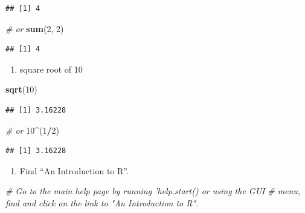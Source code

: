 \documentclass[]{book}
\newenvironment{Shaded}{\begin{snugshade}}{\end{snugshade}}
\newcommand{\KeywordTok}[1]{\textcolor[rgb]{0.13,0.29,0.53}{\textbf{#1}}}
\newcommand{\DecValTok}[1]{\textcolor[rgb]{0.00,0.00,0.81}{#1}}
\newcommand{\CommentTok}[1]{\textcolor[rgb]{0.56,0.35,0.01}{\textit{#1}}}
\newcommand{\OperatorTok}[1]{\textcolor[rgb]{0.81,0.36,0.00}{\textbf{#1}}}
\newcommand{\NormalTok}[1]{#1}
\providecommand{\tightlist}{%
  \setlength{\itemsep}{0pt}\setlength{\parskip}{0pt}}
\begin{document}
\begin{verbatim}
## [1] 4
\end{verbatim}

\begin{Shaded}
\begin{Highlighting}[]
\CommentTok{# or}
\KeywordTok{sum}\NormalTok{(}\DecValTok{2}\NormalTok{, }\DecValTok{2}\NormalTok{)}
\end{Highlighting}
\end{Shaded}

\begin{verbatim}
## [1] 4
\end{verbatim}

\begin{enumerate}
\def\labelenumi{\arabic{enumi}.}
\setcounter{enumi}{1}
\tightlist
\item
  square root of 10
\end{enumerate}

\begin{Shaded}
\begin{Highlighting}[]
\KeywordTok{sqrt}\NormalTok{(}\DecValTok{10}\NormalTok{)}
\end{Highlighting}
\end{Shaded}

\begin{verbatim}
## [1] 3.16228
\end{verbatim}

\begin{Shaded}
\begin{Highlighting}[]
\CommentTok{# or}
\DecValTok{10}\OperatorTok{^}\NormalTok{(}\DecValTok{1}\OperatorTok{/}\DecValTok{2}\NormalTok{)}
\end{Highlighting}
\end{Shaded}

\begin{verbatim}
## [1] 3.16228
\end{verbatim}

\begin{enumerate}
\def\labelenumi{\arabic{enumi}.}
\setcounter{enumi}{2}
\tightlist
\item
  Find ``An Introduction to R''.
\end{enumerate}

\begin{Shaded}
\begin{Highlighting}[]
\CommentTok{# Go to the main help page by running 'help.start() or using the GUI}
\CommentTok{# menu, find and click on the link to "An Introduction to R".}
\end{Highlighting}
\end{Shaded}
\end{document}
